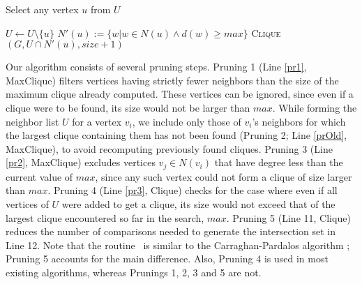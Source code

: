 \begin{algorithm}[t]
\begin{spacing}{\algospacing}
{\begin{algorithmic}[1]
  \label{pr3}
\EndIf

\State Select any vertex $u$ from $U$ 

\State $U \leftarrow U \setminus \{u\} $
\State $N'(u):= \{w | w \in N(u) \wedge d(w) \ge max\}$   \label{pr4}
\State \textsc{Clique}$( G, U \cap N'(u), size + 1)$
\EndWhile

\EndProcedure
\end{algorithmic}
}
\end{spacing}
\end{algorithm}



Our algorithm consists of several pruning steps.
Pruning 1 (Line \ref{pr1}, {\sc MaxClique}) 
filters vertices having strictly fewer neighbors than the size of the maximum clique already computed. These vertices can be ignored, since even if a clique were to be found, its size would not be larger than $max$.
While forming the neighbor list $U$ for a vertex $v_i$, we include only those of $v_i$'s 
neighbors for which the largest clique containing them has not been found 
(Pruning 2; Line \ref{prOld}, {\sc MaxClique}), 
to avoid recomputing previously found cliques.  
Pruning 3 (Line \ref{pr2}, {\sc MaxClique})
excludes vertices $v_j \in N(v_i)$  that have degree less than the current value of $max$, since any such vertex could not form a clique of size larger than $max$.
Pruning 4 (Line \ref{pr3}, {\sc Clique})
checks for the case where even if all vertices of $U$ were added to get a clique, its size would not exceed that of the largest clique encountered so far in the search, $max$. 
Pruning 5 (Line 11, {\sc Clique})
reduces the number of comparisons needed to generate the intersection set in Line 12.
Note that the routine \clq\ is similar to the 
Carraghan-Pardalos algorithm \cite{pardalos}; Pruning 5 accounts for the main difference.
Also, Pruning 4 is used in most existing algorithms, whereas Prunings 1, 2, 3 and 5 are not.


